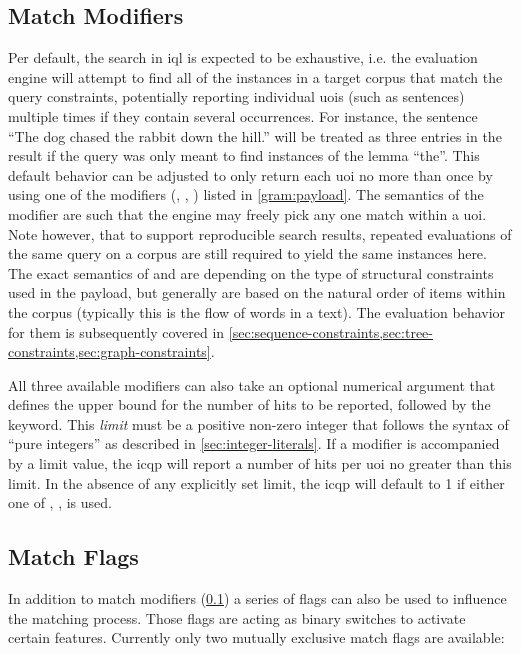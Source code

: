 \documentclass[11pt,a4paper]{report}
\begin{document}
\subsection{Match Modifiers}
\label{sec:match-modifiers}
Per default, the search in \ac{iql} is expected to be exhaustive, i.e. the evaluation engine will attempt to find all of the instances in a target corpus that match the query constraints, potentially reporting individual \acp{uoi} (such as sentences) multiple times  if they contain several occurrences.
For instance, the sentence ``The dog chased the rabbit down the hill.'' will be treated as three entries in the result if the query was only meant to find instances of the lemma ``the''.
This default behavior can be adjusted to only return each \ac{uoi} no more than once by using one of the modifiers (, , ) listed in \cref{gram:payload}.
The semantics of the  modifier are such that the engine may freely pick any one match within a \ac{uoi}.
Note however, that to support reproducible search results, repeated evaluations of the same query on a corpus are still required to yield the same instances here.
The exact semantics of  and  are depending on the type of structural constraints used in the payload, but generally are based on the natural order of items within the corpus (typically this is the flow of words in a text).
The evaluation behavior for them is subsequently covered in \cref{sec:sequence-constraints,sec:tree-constraints,sec:graph-constraints}.

All three available modifiers can also take an optional numerical argument that defines the upper bound for the number of hits to be reported, followed by the  keyword.
This \textit{limit} must be a positive non-zero integer that follows the syntax of ``pure integers'' as described in \cref{sec:integer-literals}.
If a modifier is accompanied by a limit value, the \ac{icqp} will report a number of hits per \ac{uoi} no greater than this limit.
In the absence of any explicitly set limit, the \ac{icqp} will default to 1 if either one of , ,  is used.

\subsection{Match Flags}
\label{sec:match-flags}

In addition to match modifiers (\cref{sec:match-modifiers}) a series of flags can also be used to influence the matching process.
Those flags are acting as binary switches to activate certain features.
Currently only two mutually exclusive match flags are available:
\end{document}
